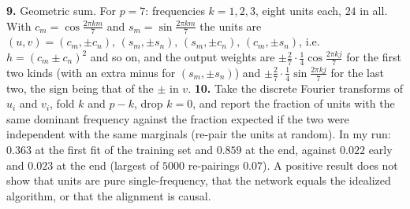 \textbf{9.} Geometric sum. For $p=7$: frequencies $k=1,2,3$, eight units each, $24$ in all. With $c_m=\cos\frac{2\pi km}7$ and $s_m=\sin\frac{2\pi km}7$ the units are $(u,v)=(c_m,\pm c_n),\,(s_m,\pm s_n),\,(s_m,\pm c_n),\,(c_m,\pm s_n)$, i.e.\ $h=(c_m\pm c_n)^2$ and so on, and the output weights are $\pm\frac27\cdot\frac14\cos\frac{2\pi kj}7$ for the first two kinds (with an extra minus for $(s_m,\pm s_n)$) and $\pm\frac27\cdot\frac14\sin\frac{2\pi kj}7$ for the last two, the sign being that of the $\pm$ in $v$. \quad
\textbf{10.} Take the discrete Fourier transforms of $u_i$ and $v_i$, fold $k$ and $p-k$, drop $k=0$, and report the fraction of units with the same dominant frequency against the fraction expected if the two were independent with the same marginals (re-pair the units at random). In my run: $0.363$ at the first fit of the training set and $0.859$ at the end, against $0.022$ early and $0.023$ at the end (largest of $5000$ re-pairings $0.07$). A positive result does not show that units are pure single-frequency, that the network equals the idealized algorithm, or that the alignment is causal.

